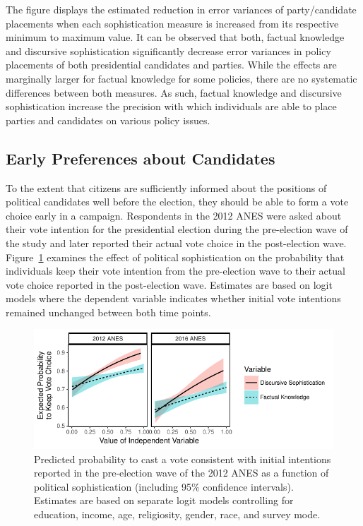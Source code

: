 \documentclass[12pt]{article}
\begin{document}
The figure displays the estimated reduction in error variances of party/candidate placements when each sophistication measure is increased from its respective minimum to maximum value. It can be observed that both, factual knowledge and discursive sophistication significantly decrease error variances in policy placements of both presidential candidates and parties. While the effects are marginally larger for factual knowledge for some policies, there are no systematic differences between both measures. As such, factual knowledge and discursive sophistication increase the precision with which individuals are able to place parties and candidates on various policy issues.


\subsection*{Early Preferences about Candidates}

To the extent that citizens are sufficiently informed about the positions of political candidates well before the election, they should be able to form a vote choice early in a campaign. Respondents in the 2012 ANES were asked about their vote intention for the presidential election during the pre-election wave of the study and later reported their actual vote choice in the post-election wave. Figure~\ref{fig:prepost} examines the effect of political sophistication on the probability that individuals keep their vote intention from the pre-election wave to their actual vote choice reported in the post-election wave. Estimates are based on logit models where the dependent variable indicates whether initial vote intentions remained unchanged between both time points.

\begin{figure}[h]\centering
\includegraphics{../fig/prepost_exp.pdf}
\caption{Predicted probability to cast a vote consistent with initial intentions reported in the pre-election wave of the 2012 ANES as a function of political sophistication (including 95\% confidence intervals). Estimates are based on separate logit models controlling for education, income, age, religiosity, gender, race, and survey mode.}\label{fig:prepost}
\end{figure}
\end{document}
